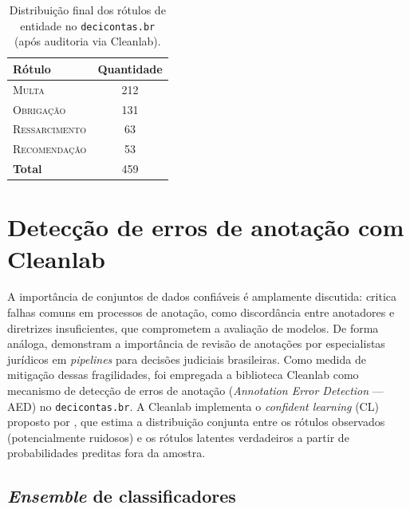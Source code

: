 \begin{table}[H]
\caption{Distribuição final dos rótulos de entidade no \texttt{decicontas.br} (após auditoria via Cleanlab).}
\centering
\begin{tabular}{lc}
\toprule
\textbf{Rótulo} & \textbf{Quantidade} \\
\midrule
\textsc{Multa} & 212 \\
\textsc{Obrigação} & 131 \\
\textsc{Ressarcimento} & 63 \\
\textsc{Recomendação} & 53 \\
\midrule
\textbf{Total} & 459 \\
\bottomrule
\end{tabular}
\label{tab:distribuicao_entidades}
\end{table}

\section{Detecção de erros de anotação com Cleanlab}
\label{sec:cleanlab}

A importância de conjuntos de dados confiáveis é amplamente discutida:  critica falhas comuns em processos de anotação, como discordância entre anotadores e diretrizes insuficientes, que comprometem a avaliação de modelos. De forma análoga,  demonstram a importância de revisão de anotações por especialistas jurídicos em \textit{pipelines} para decisões judiciais brasileiras. Como medida de mitigação dessas fragilidades, foi empregada a biblioteca Cleanlab como mecanismo de detecção de erros de anotação (\textit{Annotation Error Detection} --- AED) no \texttt{decicontas.br}. A Cleanlab implementa o \textit{confident learning} (CL) proposto por , que estima a distribuição conjunta entre os rótulos observados (potencialmente ruidosos) e os rótulos latentes verdadeiros a partir de probabilidades preditas fora da amostra.

\subsection{\textit{Ensemble} de classificadores}

